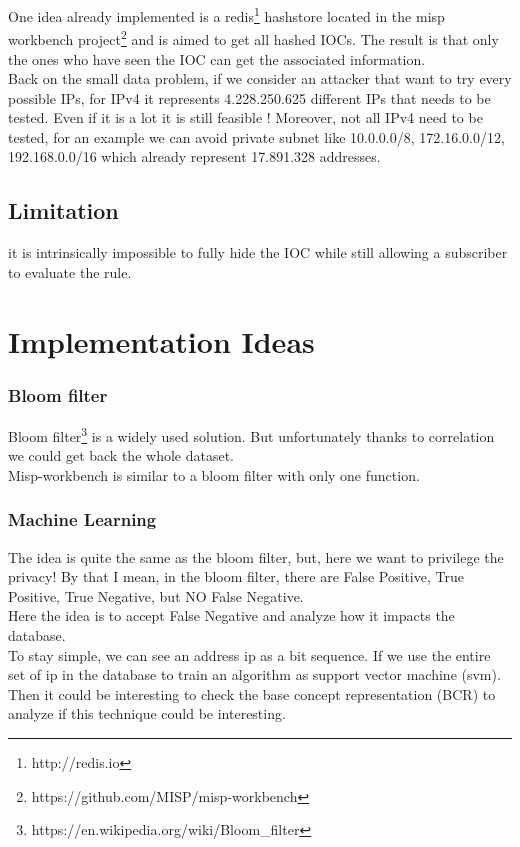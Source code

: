 \documentclass{eplmastersthesis}
\begin{document}
One idea already implemented is a redis\footnote{http://redis.io} hashstore located in the misp workbench project\footnote{https://github.com/MISP/misp-workbench} and is aimed to get all hashed IOCs.
The result is that only the ones who have seen the IOC can get the associated information. \\
Back on the small data problem, if we consider an attacker that want to try every possible IPs, for IPv4 it represents 4.228.250.625 different IPs that needs to be tested. Even if it is a lot it is still feasible ! Moreover, not all IPv4 need to be tested, for an example we can avoid private subnet like 10.0.0.0/8, 172.16.0.0/12, 192.168.0.0/16 which already represent 17.891.328 addresses.


\section{Limitation}
it is intrinsically impossible to fully hide the IOC while still allowing a subscriber to evaluate the rule. 


\chapter{Implementation Ideas}
\subsection{Bloom filter}
Bloom filter\footnote{https://en.wikipedia.org/wiki/Bloom\_filter} is a widely used solution.
But unfortunately thanks to correlation we could get back the whole dataset.\\
Misp-workbench is similar to a bloom filter with only one function.

\subsection{Machine Learning}
The idea is quite the same as the bloom filter, but, here we want to privilege the privacy! By that I mean, in the bloom filter, there are False Positive, True Positive, True Negative, but NO False Negative.\\
Here the idea is to accept False Negative and analyze how it impacts the database.\\
To stay simple, we can see an address ip as a bit sequence. If we use the entire set of ip in the database to train an algorithm as support vector machine (svm).\\
Then it could be interesting to check the base concept representation (BCR) to analyze if this technique could be interesting. \\
\end{document}
